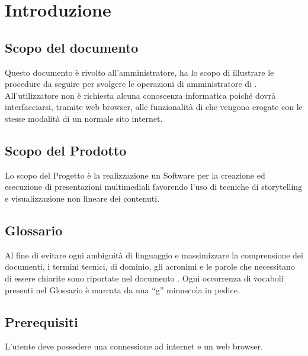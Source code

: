 \section{Introduzione}
\subsection{Scopo del documento}
Questo documento è rivolto all’amministratore, ha lo scopo di illustrare le procedure da seguire per svolgere le operazioni di amministratore di \Premi . All’utilizzatore non è richiesta alcuna conoscenza informatica poiché dovrà interfacciarsi, tramite web browser, alle funzionalità di \Premi che vengono erogate con le stesse modalità di un normale sito internet.
\subsection{Scopo del Prodotto}
Lo scopo del Progetto è la realizzazione un Software per la creazione ed esecuzione di presentazioni multimediali favorendo l’uso di tecniche di storytelling e visualizzazione non lineare dei contenuti.
\subsection{Glossario}
Al fine di evitare ogni ambiguità di linguaggio e massimizzare la comprensione dei documenti, i termini tecnici, di dominio, gli acronimi e le parole che necessitano di essere chiarite sono riportate nel documento \href{run:../../Esterni/\fGlossario}{\fEscapeGlossario}. Ogni occorrenza di vocaboli presenti nel Glossario è marcata da una “g” minuscola in pedice.
\subsection{Prerequisiti}
L’utente deve possedere una connessione ad internet e un web browser.

